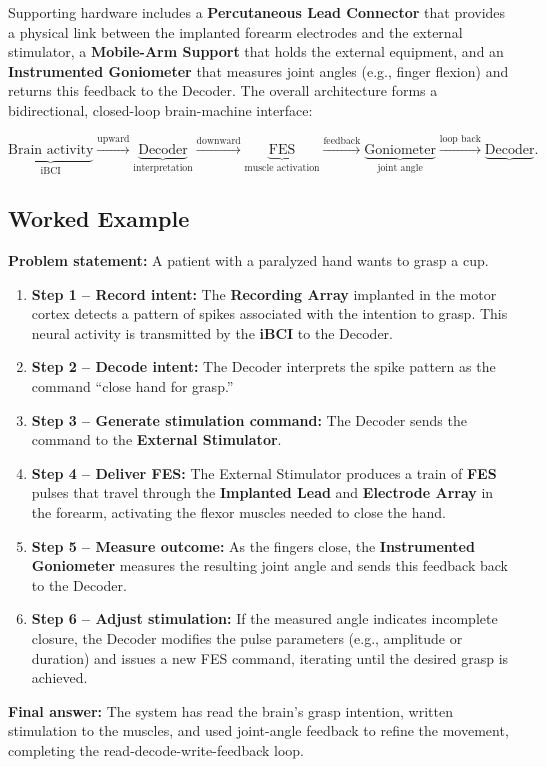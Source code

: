 \documentclass[12pt, a4paper]{article}
\begin{document}
Supporting hardware includes a \textbf{Percutaneous Lead Connector} that provides a physical link between the implanted forearm electrodes and the external stimulator, a \textbf{Mobile-Arm Support} that holds the external equipment, and an \textbf{Instrumented Goniometer} that measures joint angles (e.g., finger flexion) and returns this feedback to the Decoder. The overall architecture forms a bidirectional, closed-loop brain-machine interface:  

\[
\underbrace{\text{Brain activity}}_{\text{iBCI}} \xrightarrow{\text{upward}} \underbrace{\text{Decoder}}_{\text{interpretation}} \xrightarrow{\text{downward}} \underbrace{\text{FES}}_{\text{muscle activation}} \xrightarrow{\text{feedback}} \underbrace{\text{Goniometer}}_{\text{joint angle}} \xrightarrow{\text{loop back}} \underbrace{\text{Decoder}} .
\]

\subsection{Worked Example}
\textbf{Problem statement:} A patient with a paralyzed hand wants to grasp a cup.

\begin{enumerate}
\item \textbf{Step 1 -- Record intent:} The \textbf{Recording Array} implanted in the motor cortex detects a pattern of spikes associated with the intention to grasp. This neural activity is transmitted by the \textbf{iBCI} to the Decoder.
\item \textbf{Step 2 -- Decode intent:} The Decoder interprets the spike pattern as the command ``close hand for grasp.''
\item \textbf{Step 3 -- Generate stimulation command:} The Decoder sends the command to the \textbf{External Stimulator}.
\item \textbf{Step 4 -- Deliver FES:} The External Stimulator produces a train of \textbf{FES} pulses that travel through the \textbf{Implanted Lead} and \textbf{Electrode Array} in the forearm, activating the flexor muscles needed to close the hand.
\item \textbf{Step 5 -- Measure outcome:} As the fingers close, the \textbf{Instrumented Goniometer} measures the resulting joint angle and sends this feedback back to the Decoder.
\item \textbf{Step 6 -- Adjust stimulation:} If the measured angle indicates incomplete closure, the Decoder modifies the pulse parameters (e.g., amplitude or duration) and issues a new FES command, iterating until the desired grasp is achieved.
\end{enumerate}
\textbf{Final answer:} The system has read the brain's grasp intention, written stimulation to the muscles, and used joint-angle feedback to refine the movement, completing the read-decode-write-feedback loop.
\end{document}
